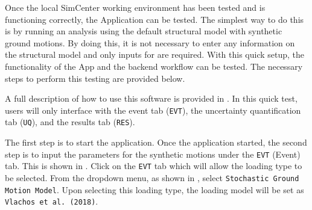 Once the local SimCenter working environment has been tested and is
functioning correctly, the \texttt{\getsoftwarename{}} Application
can be tested. The simplest way to do this is by running an analysis
using the default structural model with synthetic ground motions. By
doing this, it is not necessary to enter any information on the
structural model and only inputs for 
are required. With this quick setup, the
functionality of the \texttt{\getsoftwarename{}} App and the backend
workflow can be tested. The necessary steps to perform this
testing are provided below.

A full description of how to use this software is provided
in .  In this quick test, users will only
interface with the event tab (\texttt{EVT}), the uncertainty
quantification tab (\texttt{UQ}), 
and the results tab (\texttt{RES}).

The first step is to start the \texttt{\getsoftwarename{}}
application.  Once the application started, the second step is to
input the parameters for the synthetic motions under the \texttt{EVT}
(Event) tab. This is shown in . Click
on the \texttt{EVT} tab which will allow the loading type to be
selected. From the dropdown menu, as shown
in , select \texttt{Stochastic Ground Motion
Model}. Upon selecting this loading type, the loading model will be
set as \texttt{Vlachos et al. (2018)}.



